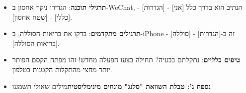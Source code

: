 
\begin{itemize}
  \item \textbf{תרגילי תוכנה}: הגדירו ניקוי אחסון ב-WeChat, הנתיב הוא בדרך כלל [אני] - [הגדרות] - [כללי] - [שטח אחסון].
  \item \textbf{תרגילים מתקדמים}: בדקו את בריאות הסוללה, ב-iPhone זה ב-[הגדרות] - [סוללה] - [בריאות הסוללה].
  \item \textbf{טיפים כלליים}: נתקלתם בבעיה? תחילה בצעו הפעלה מחדש! זהו מפתח הקסם הפותר יותר מחצי מהתקלות הקטנות בטלפון.
  \item \textbf{נספח ג': טבלת השוואת "סלנג" מונחים מינימליסטית}מילים שאולי תשמעו
\end{itemize}
